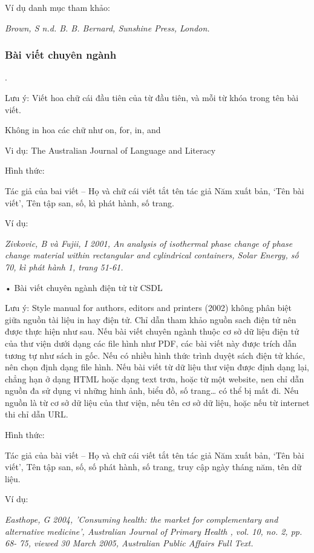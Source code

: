 \documentclass{hcmutarticle}
\begin{document}
Ví dụ danh mục tham khảo:

{\em Brown, S n.d. B. B. Bernard, Sunshine Press, London.}

\subsubsection{Bài viết chuyên ngành}.

Lưu ý: Viết hoa chữ cái đầu tiên của từ đầu tiên, và mỗi từ khóa trong tên bài viết.

Không in hoa các chữ như on, for, in, and


Vi dụ: The Australian Journal of Language and Literacy

Hình thức:

Tác giả của bai viết – Họ và chữ cái viết tắt tên tác giả Năm xuất bản, ‘Tên bài viết’, Tên tập san, số, kì phát hành, số trang.

Ví dụ:

{\em Zivkovic, B và Fujii, I 2001, An analysis of isothermal phase change of phase change material within rectangular and cylindrical containers, Solar Energy, số 70, kì phát hành 1, trang 51-61.}

•	Bài viết chuyên ngành điện tử từ CSDL

Lưu ý: Style manual for authors, editors and printers (2002) không phân biệt giữa nguồn tài liệu in hay điện tử. Chỉ dẫn tham khảo nguồn sach điện tử nên được thực hiện như sau. Nếu bài viết chuyên ngành thuộc cơ sở dữ liệu điện tử của thư viện dưới dạng các file hình như PDF, các bài viết này được trích dẫn tương tự như sách in gốc. Nếu có nhiều hình thức trình duyệt sách điện tử khác, nên chọn định dạng file hình. Nếu bài viết từ dữ liệu thư viện được định dạng lại, chẳng hạn ở dạng HTML hoặc dạng text trơn, hoặc từ một website, nen chỉ dẫn nguồn đa sử dụng vi những hinh ảnh, biểu đồ, số trang… có thể bị mất đi. Nếu nguồn là từ cơ sở dữ liệu của thư viện, nếu tên cơ sở dữ liệu, hoặc nếu từ internet thi chỉ dẫn URL.

Hình thức:

Tác giả của bài viết – Họ và chữ cái viết tắt tên tác giả Năm xuất bản, ‘Tên bài viết’, Tên tập san, số, số phát hành, số trang, truy cập ngày tháng năm, tên dữ liệu.

Ví dụ:

{\em Easthope, G 2004, 'Consuming health: the market for complementary and alternative medicine', Australian Journal of Primary Health , vol. 10, no. 2,  pp. 68- 75, viewed 30 March 2005, Australian Public Affairs Full Text.}
\end{document}
